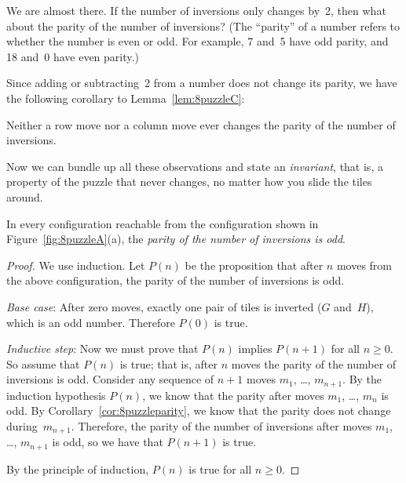 We are almost there.  If the number of inversions only changes by~2,
then what about the parity of the number of inversions?  (The
``parity'' of a number refers to whether the number is even or odd.
For example, 7 and~5 have odd parity, and 18 and~0 have even parity.)

Since adding or subtracting~2 from a number does not change its
parity, we have the following corollary to Lemma~\ref{lem:8puzzleC}:
\begin{corollary}\label{cor:8puzzleparity}
Neither a row move nor a column move ever changes the parity of the number
of inversions.
\end{corollary}

Now we can bundle up all these observations and state an
\emph{invariant}, that is, a property of the puzzle that never
changes, no matter how you slide the tiles around.

\begin{lemma}\label{lem:8puzzleD}
In every configuration reachable from the configuration shown in
Figure~\ref{fig:8puzzleA}(a), the \emph{parity of the number of inversions
  is odd}.
\end{lemma}

\begin{proof}
We use induction.  Let $P(n)$ be the proposition that after $n$ moves
from the above configuration, the parity of the number of inversions
is odd.

\emph{Base case}: After zero moves, exactly one pair of tiles is
inverted ($G$ and~$H$), which is an odd number.  Therefore $P(0)$ is
true.

\emph{Inductive step}:
Now we must prove that $P(n)$ implies $P(n+1)$ for all $n \ge 0$.  So
assume that $P(n)$ is true; that is, after $n$ moves the parity of the
number of inversions is odd.  Consider any sequence of $n+1$ moves
$m_1$, \dots, $m_{n+1}$.  By the induction hypothesis $P(n)$, we know
that the parity after moves $m_1$, \dots, $m_{n}$ is odd.  By
Corollary~\ref{cor:8puzzleparity}, we know that the parity does not
change during~$m_{n+1}$.  Therefore, the parity of the number of
inversions after moves $m_1$, \dots, $m_{n+1}$ is odd, so we have that
$P(n + 1)$ is true.

By the principle of induction, $P(n)$ is true for all $n \ge 0$.
\end{proof}

